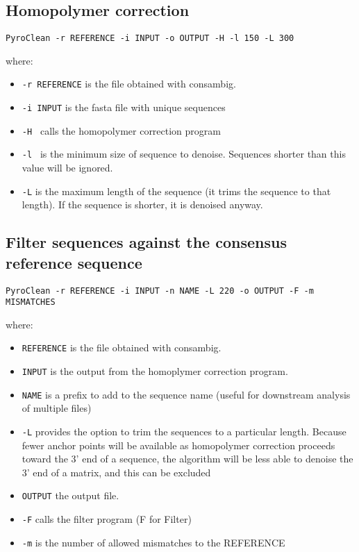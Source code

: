 \documentclass[12pt]{article}
\begin{document}
\subsection{Homopolymer correction}


\begin{verbatim}
PyroClean -r REFERENCE -i INPUT -o OUTPUT -H -l 150 -L 300 
\end{verbatim}
where:
\begin{itemize}
\item  \verb|-r REFERENCE| is the file obtained with consambig.
\item \verb|-i INPUT| is the fasta file with unique sequences
\item \verb|-H | calls the homopolymer correction program
\item \verb|-l | is the minimum size of sequence to denoise. Sequences shorter than this value will be ignored. 
\item \verb|-L|  is the maximum length of the sequence (it trims the sequence to that length). If the sequence is shorter, it is denoised anyway. 
\end{itemize}


\subsection{Filter sequences against the consensus reference sequence}

\begin{verbatim}
PyroClean -r REFERENCE -i INPUT -n NAME -L 220 -o OUTPUT -F -m MISMATCHES
\end{verbatim}
where:
\begin{itemize}
\item  \verb|REFERENCE|  is the file obtained with consambig. 
\item  \verb|INPUT| is the output from the homoplymer correction program. 
\item   \verb|NAME| is a prefix to add to the sequence name (useful for downstream analysis of multiple files)
\item   \verb|-L|  provides the option to trim the sequences to a particular length.  Because fewer anchor points will be available as homopolymer correction proceeds toward the 3’ end of a sequence, the algorithm will be less able to denoise the 3’ end of a matrix, and this can be excluded
\item   \verb|OUTPUT| the output file. 
\item   \verb|-F| calls the filter program (F for Filter)
\item   \verb|-m| is  the number of allowed mismatches to the REFERENCE
\end{itemize}
\end{document}
